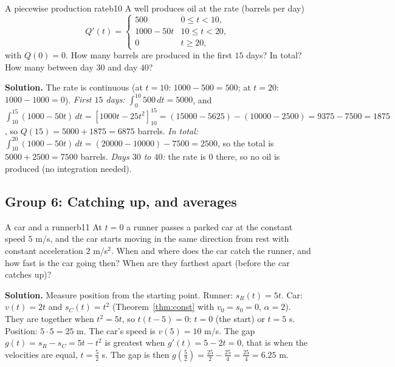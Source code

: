 \documentclass[11pt]{article}
\begin{document}
\begin{exmp}{A piecewise production rate}{b10}
A well produces oil at the rate (barrels per day)
\[
Q'(t)=\begin{cases}500&0\le t<10,\\1000-50t&10\le t<20,\\0&t\ge20,\end{cases}
\]
with $Q(0)=0$. How many barrels are produced in the first $15$ days? In total? How many between day $30$ and day $40$?

\textbf{Solution.} The rate is continuous (at $t=10$: $1000-500=500$; at $t=20$: $1000-1000=0$). \emph{First $15$ days:} $\int_0^{10}500\,dt=5000$, and $\int_{10}^{15}(1000-50t)\,dt=\left[1000t-25t^2\right]_{10}^{15}=(15000-5625)-(10000-2500)=9375-7500=1875$, so $Q(15)=5000+1875=6875$ barrels.
\emph{In total:} $\int_{10}^{20}(1000-50t)\,dt=(20000-10000)-7500=2500$, so the total is $5000+2500=7500$ barrels. \emph{Days $30$ to $40$:} the rate is $0$ there, so no oil is produced (no integration needed).
\end{exmp}

\subsection*{Group 6: Catching up, and averages}

\begin{exmp}{A car and a runner}{b11}
At $t=0$ a runner passes a parked car at the constant speed $5$ m/s, and the car starts moving in the same direction from rest with constant acceleration $2$ m/s$^2$. When and where does the car catch the runner, and how fast is the car going then? When are they farthest apart (before the car catches up)?

\textbf{Solution.} Measure position from the starting point. Runner: $s_R(t)=5t$. Car: $v(t)=2t$ and $s_C(t)=t^2$ (Theorem~\ref{thm:const} with $v_0=s_0=0$, $\alpha=2$). They are together when $t^2=5t$, so $t(t-5)=0$: $t=0$ (the start) or $t=5$ s. Position: $5\cdot5=25$ m. The car's speed is $v(5)=10$ m/s.
The gap $g(t)=s_R-s_C=5t-t^2$ is greatest when $g'(t)=5-2t=0$, that is when the velocities are equal, $t=\frac52$ s. The gap is then $g\left(\frac52\right)=\frac{25}2-\frac{25}4=\frac{25}4=6.25$ m.
\end{exmp}
\end{document}
